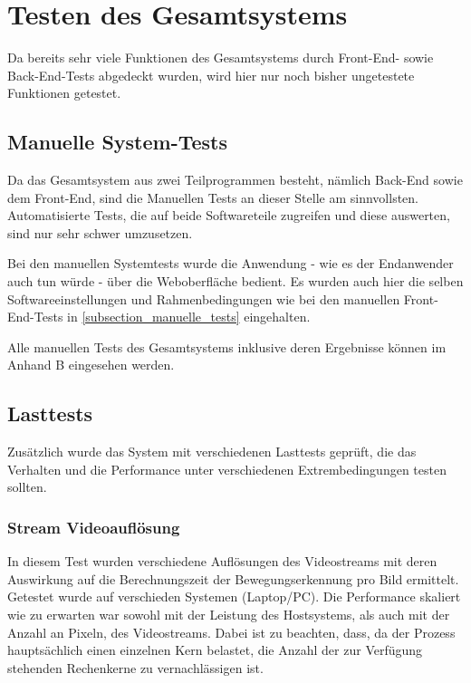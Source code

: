 \section{Testen des Gesamtsystems}
Da bereits sehr viele Funktionen des Gesamtsystems durch Front-End- sowie Back-End-Tests abgedeckt wurden, wird hier nur noch bisher ungetestete Funktionen getestet.

\subsection{Manuelle System-Tests}
Da das Gesamtsystem aus zwei Teilprogrammen besteht, nämlich Back-End sowie dem Front-End, sind die Manuellen Tests an dieser Stelle am sinnvollsten. Automatisierte Tests, die auf beide Softwareteile zugreifen und diese auswerten, sind nur sehr schwer umzusetzen. 

Bei den manuellen Systemtests wurde die Anwendung - wie es der Endanwender auch tun würde - über die Weboberfläche bedient. Es wurden auch hier die selben Softwareeinstellungen und Rahmenbedingungen wie bei den manuellen Front-End-Tests in \ref{subsection_manuelle_tests} eingehalten. 

\vspace{0.5cm}

Alle manuellen Tests des Gesamtsystems inklusive deren Ergebnisse können im Anhand B eingesehen werden.

\subsection{Lasttests}

Zusätzlich wurde das System mit verschiedenen Lasttests geprüft, die das Verhalten und die Performance unter verschiedenen Extrembedingungen testen sollten.
\subsubsection{Stream Videoauflösung}
In diesem Test wurden verschiedene Auflösungen des Videostreams mit deren Auswirkung auf die Berechnungszeit der Bewegungserkennung pro Bild ermittelt. Getestet wurde auf verschieden Systemen (Laptop/PC). Die Performance skaliert wie zu erwarten war sowohl mit der Leistung des Hostsystems, als auch mit der Anzahl an Pixeln, des Videostreams. Dabei ist zu beachten, dass, da der Prozess hauptsächlich einen einzelnen Kern belastet, die Anzahl der zur Verfügung stehenden Rechenkerne zu vernachlässigen ist.

